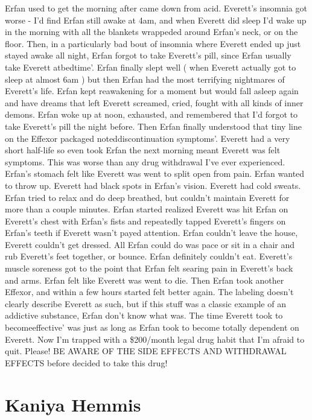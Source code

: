 \documentclass[12pt]{book}
\begin{document}
Erfan used to get the morning after came down from acid. Everett's insomnia got worse - I'd find Erfan still awake at 4am, and when Everett did sleep I'd wake up in the morning with all the blankets wrappeded around Erfan's neck, or on the floor. Then, in a particularly bad bout of insomnia where Everett ended up just stayed awake all night, Erfan forgot to take Everett's pill, since Erfan usually take Everett atbedtime'. Erfan finally slept well ( when Everett actually got to sleep at almost 6am ) but then Erfan had the most terrifying nightmares of Everett's life. Erfan kept reawakening for a moment but would fall asleep again and have dreams that left Everett screamed, cried, fought with all kinds of inner demons. Erfan woke up at noon, exhausted, and remembered that I'd forgot to take Everett's pill the night before. Then Erfan finally understood that tiny line on the Effexor packaged noteddiscontinuation symptoms'. Everett had a very short half-life so even took Erfan the next morning meant Everett was felt symptoms. This was worse than any drug withdrawal I've ever experienced. Erfan's stomach felt like Everett was went to split open from pain. Erfan wanted to throw up. Everett had black spots in Erfan's vision. Everett had cold sweats. Erfan tried to relax and do deep breathed, but couldn't maintain Everett for more than a couple minutes. Erfan started realized Everett was hit Erfan on Everett's chest with Erfan's fists and repeatedly tapped Everett's fingers on Erfan's teeth if Everett wasn't payed attention. Erfan couldn't leave the house, Everett couldn't get dressed. All Erfan could do was pace or sit in a chair and rub Everett's feet together, or bounce. Erfan definitely couldn't eat. Everett's muscle soreness got to the point that Erfan felt searing pain in Everett's back and arms. Erfan felt like Everett was went to die. Then Erfan took another Effexor, and within a few hours started felt better again. The labeling doesn't clearly describe Everett as such, but if this stuff was a classic example of an addictive substance, Erfan don't know what was. The time Everett took to becomeeffective' was just as long as Erfan took to become totally dependent on Everett. Now I'm trapped with a \$200/month legal drug habit that I'm afraid to quit. Please! BE AWARE OF THE SIDE EFFECTS AND WITHDRAWAL EFFECTS before decided to take this drug!



\chapter{Kaniya Hemmis}
\end{document}
